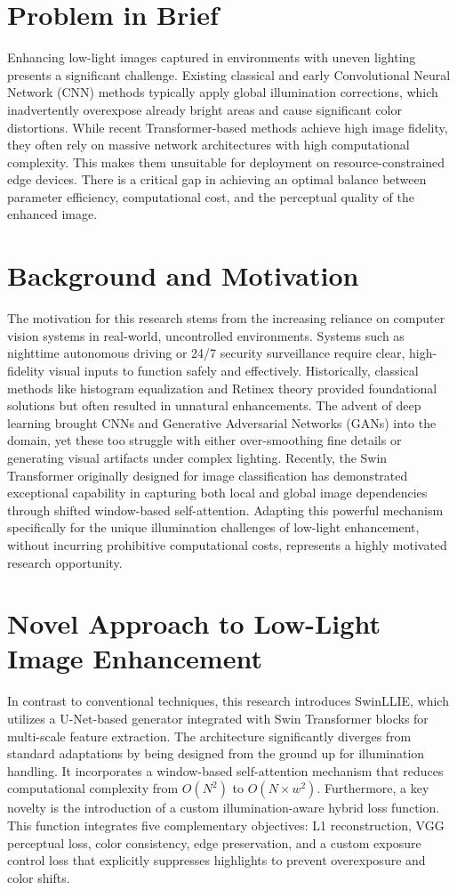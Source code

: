 \documentclass[12pt, a4paper]{report}
\begin{document}
\section{Problem in Brief}
Enhancing low-light images captured in environments with uneven lighting presents a significant challenge. Existing classical and early Convolutional Neural Network (CNN) methods typically apply global illumination corrections, which inadvertently overexpose already bright areas and cause significant color distortions. While recent Transformer-based methods achieve high image fidelity, they often rely on massive network architectures with high computational complexity. This makes them unsuitable for deployment on resource-constrained edge devices. There is a critical gap in achieving an optimal balance between parameter efficiency, computational cost, and the perceptual quality of the enhanced image.

\section{Background and Motivation}
The motivation for this research stems from the increasing reliance on computer vision systems in real-world, uncontrolled environments. Systems such as nighttime autonomous driving or 24/7 security surveillance require clear, high-fidelity visual inputs to function safely and effectively. Historically, classical methods like histogram equalization and Retinex theory provided foundational solutions but often resulted in unnatural enhancements. The advent of deep learning brought CNNs and Generative Adversarial Networks (GANs) into the domain, yet these too struggle with either over-smoothing fine details or generating visual artifacts under complex lighting. Recently, the Swin Transformer originally designed for image classification has demonstrated exceptional capability in capturing both local and global image dependencies through shifted window-based self-attention. Adapting this powerful mechanism specifically for the unique illumination challenges of low-light enhancement, without incurring prohibitive computational costs, represents a highly motivated research opportunity.

\section{Novel Approach to Low-Light Image Enhancement}
In contrast to conventional techniques, this research introduces SwinLLIE, which utilizes a U-Net-based generator integrated with Swin Transformer blocks for multi-scale feature extraction. The architecture significantly diverges from standard adaptations by being designed from the ground up for illumination handling. It incorporates a window-based self-attention mechanism that reduces computational complexity from $O(N^2)$ to $O(N \times w^2)$. Furthermore, a key novelty is the introduction of a custom illumination-aware hybrid loss function. This function integrates five complementary objectives: L1 reconstruction, VGG perceptual loss, color consistency, edge preservation, and a custom exposure control loss that explicitly suppresses highlights to prevent overexposure and color shifts.
\end{document}
